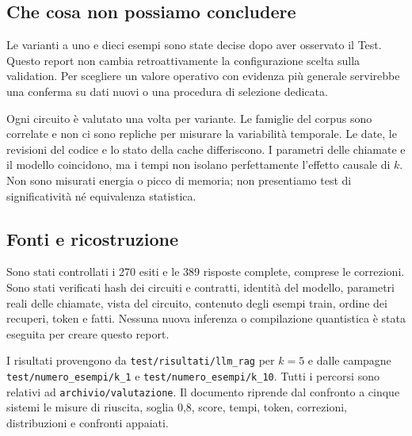 \documentclass[a4paper,10pt]{article}
\begin{document}
\subsection{Che cosa non possiamo concludere}
Le varianti a uno e dieci esempi sono state decise dopo aver osservato il Test.
Questo report non cambia retroattivamente la configurazione scelta sulla
validation. Per scegliere un valore operativo con evidenza più generale
servirebbe una conferma su dati nuovi o una procedura di selezione dedicata.

Ogni circuito è valutato una volta per variante. Le famiglie del corpus sono
correlate e non ci sono repliche per misurare la variabilità temporale.
Le date, le revisioni del codice e lo stato della cache differiscono.
I parametri delle chiamate e il modello coincidono, ma i tempi non isolano
perfettamente l'effetto causale di $k$. Non sono misurati energia o picco
di memoria; non presentiamo test di significatività né equivalenza statistica.

\subsection{Fonti e ricostruzione}
Sono stati controllati i 270 esiti e le 389 risposte complete, comprese
le correzioni. Sono stati verificati hash dei circuiti e contratti, identità
del modello, parametri reali delle chiamate, vista del circuito, contenuto
degli esempi train, ordine dei recuperi, token e fatti. Nessuna nuova inferenza
o compilazione quantistica è stata eseguita per creare questo report.

I risultati provengono da \nolinkurl{test/risultati/llm_rag} per $k=5$ e dalle
campagne \nolinkurl{test/numero_esempi/k_1} e \nolinkurl{test/numero_esempi/k_10}.
Tutti i percorsi sono relativi ad \nolinkurl{archivio/valutazione}.
Il documento riprende dal confronto a cinque sistemi le misure di riuscita,
soglia 0,8, score, tempi, token, correzioni, distribuzioni e confronti appaiati.
\end{document}
